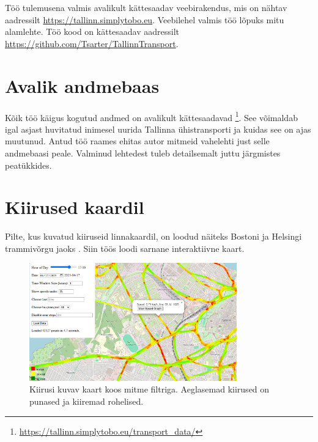 Töö tulemusena valmis avalikult kättesaadav veebirakendus, mis on nähtav aadressilt \url{https://tallinn.simplytobo.eu}. Veebilehel valmis töö lõpuks mitu alamlehte. Töö kood on kättesaadav aadressilt \url{https://github.com/Tsarter/TallinnTransport}.

\section{Avalik andmebaas}

Kõik töö käigus kogutud andmed on avalikult kättesaadavad \footnote{\url{https://tallinn.simplytobo.eu/transport_data/}}. See võimaldab igal asjast huvitatud inimesel uurida Tallinna ühistransporti ja kuidas see on ajas muutunud. Antud töö raames ehitas autor mitmeid vahelehti just selle andmebaasi peale. Valminud lehtedest tuleb detailsemalt juttu järgmistes peatükkides. 

\section{Kiirused kaardil}\label{section:Kiirused-kaardil}

Pilte, kus kuvatud kiiruseid linnakaardil, on loodud näiteks Bostoni \cite{boston_woodruff_mbta_2011} ja Helsingi trammivõrgu jaoks \cite{jlf_tram_speeds}. Siin töös loodi sarnane interaktiivne kaart.

\begin{figure}[h!]
    \centering
    \includegraphics[width=0.8\textwidth]{figures/speedSegmentMap2.png}
    \caption{Kiirusi kuvav kaart koos mitme filtriga. Aeglasemad kiirused on punased ja kiiremad rohelised. }
    \label{fig:Kiirustekaart}
\end{figure}

